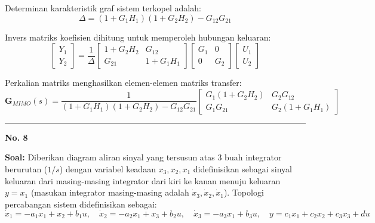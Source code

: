 \documentclass[11pt,a4paper]{article}
\begin{document}
Determinan karakteristik graf sistem terkopel adalah:
$$\Delta = (1 + G_1 H_1)(1 + G_2 H_2) - G_{12} G_{21}$$

Invers matriks koefisien dihitung untuk memperoleh hubungan keluaran:
$$\begin{bmatrix} Y_1 \\ Y_2 \end{bmatrix} = \frac{1}{\Delta} \begin{bmatrix} 1 + G_2 H_2 & G_{12} \\ G_{21} & 1 + G_1 H_1 \end{bmatrix} \begin{bmatrix} G_1 & 0 \\ 0 & G_2 \end{bmatrix} \begin{bmatrix} U_1 \\ U_2 \end{bmatrix}$$

Perkalian matriks menghasilkan elemen-elemen matriks transfer:
$$\mathbf{G}_{MIMO}(s) = \frac{1}{(1 + G_1 H_1)(1 + G_2 H_2) - G_{12} G_{21}} \begin{bmatrix} G_1(1 + G_2 H_2) & G_2 G_{12} \\ G_1 G_{21} & G_2(1 + G_1 H_1) \end{bmatrix}$$

\vspace{12pt}
\hrule
\vspace{10pt}

\textbf{\large No. 8}

\textbf{Soal:}  
Diberikan diagram aliran sinyal yang tersusun atas 3 buah integrator berurutan ($1/s$) dengan variabel keadaan $x_3, x_2, x_1$ didefinisikan sebagai sinyal keluaran dari masing-masing integrator dari kiri ke kanan menuju keluaran $y = x_1$ (masukan integrator masing-masing adalah $\dot{x}_3, \dot{x}_2, \dot{x}_1$). Topologi percabangan sistem didefinisikan sebagai:
$$\dot{x}_1 = -a_1 x_1 + x_2 + b_1 u, \quad \dot{x}_2 = -a_2 x_1 + x_3 + b_2 u, \quad \dot{x}_3 = -a_3 x_1 + b_3 u, \quad y = c_1 x_1 + c_2 x_2 + c_3 x_3 + d u$$
\end{document}
